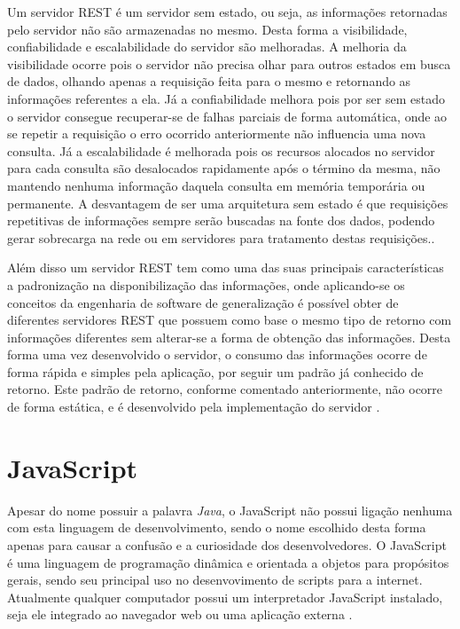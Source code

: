 Um servidor REST é um servidor sem estado, ou seja, as informações retornadas pelo servidor não são armazenadas no mesmo. Desta forma a visibilidade, confiabilidade e escalabilidade do servidor são melhoradas. A melhoria da visibilidade ocorre pois o servidor não precisa olhar para outros estados em busca de dados, olhando apenas a requisição feita para o mesmo e retornando as informações referentes a ela. Já a confiabilidade melhora pois por ser sem estado o servidor consegue recuperar-se de falhas parciais de forma automática, onde ao se repetir a requisição o erro ocorrido anteriormente não influencia uma nova consulta. Já a escalabilidade é melhorada pois os recursos alocados no servidor para cada consulta são desalocados rapidamente após o término da mesma, não mantendo nenhuma informação daquela consulta em memória temporária ou permanente. A desvantagem de ser uma arquitetura sem estado é que requisições repetitivas de informações sempre serão buscadas na fonte dos dados, podendo gerar sobrecarga na rede ou em servidores para tratamento destas requisições.\cite{RESTFielding}.

Além disso um servidor REST tem como uma das suas principais características a padronização na disponibilização das informações, onde aplicando-se os conceitos da engenharia de software de generalização é possível obter de diferentes servidores REST que possuem como base o mesmo tipo de retorno com informações diferentes sem alterar-se a forma de obtenção das informações. Desta forma uma vez desenvolvido o servidor, o consumo das informações ocorre de forma rápida e simples pela aplicação, por seguir um padrão já conhecido de retorno. Este padrão de retorno, conforme comentado anteriormente, não ocorre de forma estática, e é desenvolvido pela implementação do servidor \cite{RESTFielding}.

\section{JavaScript}
Apesar do nome possuir a palavra \emph{Java}, o JavaScript não possui ligação nenhuma com esta linguagem de desenvolvimento, sendo o nome escolhido desta forma apenas para causar a confusão e a curiosidade dos desenvolvedores. O JavaScript é uma linguagem de programação dinâmica e orientada a objetos para propósitos gerais, sendo seu principal uso no desenvovimento de scripts para a internet. Atualmente qualquer computador possui um interpretador JavaScript instalado, seja ele integrado ao navegador web ou uma aplicação externa \cite{JavaScriptCrockford}.


